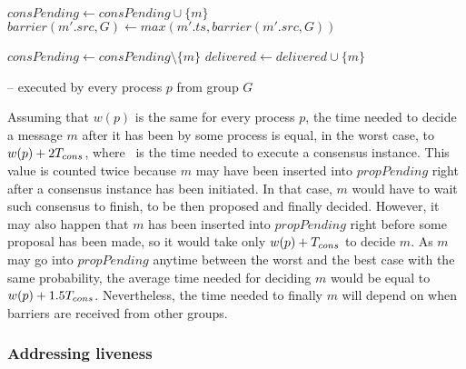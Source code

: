 \documentclass[times, 10pt]{article}
\begin{document}
\begin{algorithm}
\begin{distribalgo}[1]
\blankline
{}
    \STATE $consPending \leftarrow consPending \cup \{m\}$
  \ENDIF
  \STATE $barrier(m'.src,G) \leftarrow max(m'.ts, barrier(m'.src,G))$ \label{algline:incbar} 
\ENDINDENT

\blankline
{}
  \STATE $consPending \leftarrow consPending \setminus \{m\}$
  \STATE {}
  \STATE $delivered \leftarrow delivered \cup \{m\}$

\blankline
\ENDINDENT

\caption{ -- executed by every process $p$ from group $G$}
\label{algorithm:quasi}
\end{distribalgo}
\end{algorithm}

Assuming that $w(p)$ is the same for every process $p$, the time needed to decide a message $m$ after it has been \cms{} by some process is equal, in the worst case, to $w(p) + 2T_{cons}$, where \tcons\ is the time needed to execute a consensus instance. This value is counted twice because $m$ may have been inserted into $propPending$ right after a consensus instance has been initiated. In that case, $m$ would have to wait such consensus to finish, to be then proposed and finally decided. However, it may also happen that $m$ has been inserted into $propPending$ right before some proposal has been made, so it would take only $w(p) + T_{cons}$ to decide $m$. As $m$ may go into $propPending$ anytime between the worst and the best case with the same probability, the average time needed for deciding $m$ would be equal to $w(p) + 1.5T_{cons}$. Nevertheless, the time needed to finally \cons{} $m$ will depend on when barriers are received from other groups.

\subsubsection{Addressing liveness}
\end{document}
